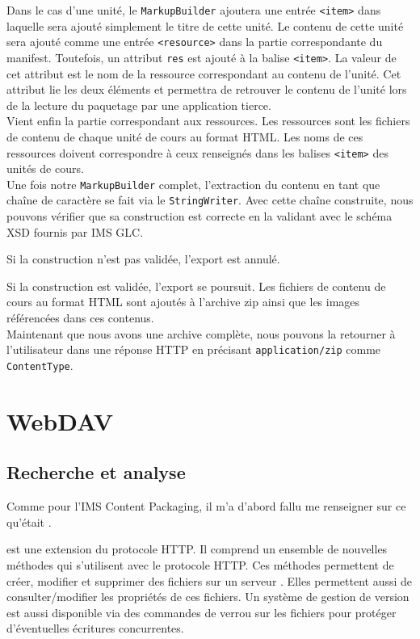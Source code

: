 Dans le cas d'une unité, le {\tt MarkupBuilder} ajoutera une entrée {\tt <item>}
dans laquelle sera ajouté simplement le titre de cette unité. Le contenu de
cette unité sera ajouté comme une entrée {\tt <resource>} dans la partie
correspondante du manifest. Toutefois, un attribut {\tt res} est ajouté à la
balise {\tt <item>}. La valeur de cet attribut est le nom de la ressource
correspondant au contenu de l'unité. Cet attribut lie les deux éléments et
permettra de retrouver le contenu de l'unité lors de la lecture du paquetage par
une application tierce.\\

Vient enfin la partie correspondant aux ressources. Les ressources sont les
fichiers de contenu de chaque unité de cours au format HTML. Les noms de ces
ressources doivent correspondre à ceux renseignés dans les balises {\tt <item>}
des unités de cours.\\

Une fois notre {\tt MarkupBuilder} complet, l'extraction du contenu en tant que
chaîne de caractère se fait via le {\tt StringWriter}. Avec cette chaîne
construite, nous pouvons vérifier que sa construction est correcte en la
validant avec le schéma XSD fournis par IMS GLC.

Si la construction n'est pas validée, l'export est annulé.

Si la construction est validée, l'export se poursuit. Les fichiers de contenu de
cours au format HTML sont ajoutés à l'archive zip ainsi que les images
référencées dans ces contenus.\\

Maintenant que nous avons une archive complète, nous pouvons la retourner à
l'utilisateur dans une réponse HTTP en précisant {\tt application/zip} comme
{\tt ContentType}.

\section{WebDAV}
\subsection{Recherche et analyse}
Comme pour l'IMS Content Packaging, il m'a d'abord fallu me renseigner sur ce
qu'était .

 est une extension du protocole HTTP. Il comprend un ensemble de nouvelles
méthodes qui s'utilisent avec le protocole HTTP. Ces méthodes permettent de
créer, modifier et supprimer des fichiers sur un serveur . Elles
permettent aussi de consulter/modifier les propriétés de ces fichiers. Un
système de gestion de version est aussi disponible via des commandes de verrou
sur les fichiers pour protéger d'éventuelles écritures concurrentes.

